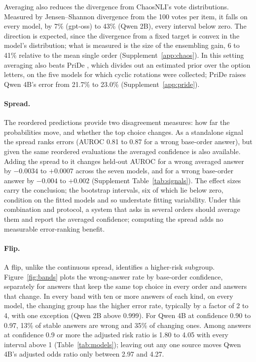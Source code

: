 \documentclass[10pt,twocolumn]{article}
\begin{document}
Averaging also reduces the divergence from ChaosNLI's vote distributions. Measured by Jensen--Shannon divergence from the 100 votes per item, it falls on every model, by 7\% (gpt-oss) to 43\% (Qwen 2B), every interval below zero. The direction is expected, since the divergence from a fixed target is convex in the model's distribution; what is measured is the size of the ensembling gain, 6 to 41\% relative to the mean single order (Supplement~\ref{app:chaos}). In this setting averaging also beats PriDe \citep{zheng2024robust}, which divides out an estimated prior over the option letters, on the five models for which cyclic rotations were collected; PriDe raises Qwen 4B's error from 21.7\% to 23.0\% (Supplement~\ref{app:pride}).

\paragraph{Spread.} The reordered predictions provide two disagreement measures: how far the probabilities move, and whether the top choice changes. As a standalone signal the spread ranks errors (AUROC 0.81 to 0.87 for a wrong base-order answer), but given the same reordered evaluations the averaged confidence is also available. Adding the spread to it changes held-out AUROC for a wrong averaged answer by $-0.0034$ to $+0.0007$ across the seven models, and for a wrong base-order answer by $-0.004$ to $+0.002$ (Supplement Table~\ref{tab:signals}). The effect sizes carry the conclusion; the bootstrap intervals, six of which lie below zero, condition on the fitted models and so understate fitting variability. Under this combination and protocol, a system that asks in several orders should average them and report the averaged confidence; computing the spread adds no measurable error-ranking benefit.

\paragraph{Flip.} A flip, unlike the continuous spread, identifies a higher-risk subgroup. Figure~\ref{fig:bands} plots the wrong-answer rate by base-order confidence, separately for answers that keep the same top choice in every order and answers that change. In every band with ten or more answers of each kind, on every model, the changing group has the higher error rate, typically by a factor of 2 to 4, with one exception (Qwen 2B above 0.999). For Qwen 4B at confidence 0.90 to 0.97, 13\% of stable answers are wrong and 35\% of changing ones. Among answers at confidence 0.9 or more the adjusted risk ratio is 1.80 to 4.05 with every interval above 1 (Table~\ref{tab:models}); leaving out any one source moves Qwen 4B's adjusted odds ratio only between 2.97 and 4.27.
\end{document}
